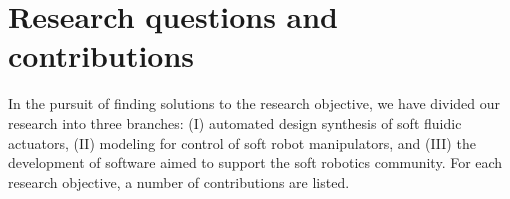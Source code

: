 
\section{Research questions and contributions}
In the pursuit of finding solutions to the research objective, we have divided our research into three branches: (I) automated design synthesis of soft fluidic actuators, (II) modeling for control of soft robot manipulators, and (III) the development of software aimed to support the soft robotics community. For each research objective, a number of contributions are listed. \\[0.1em]

